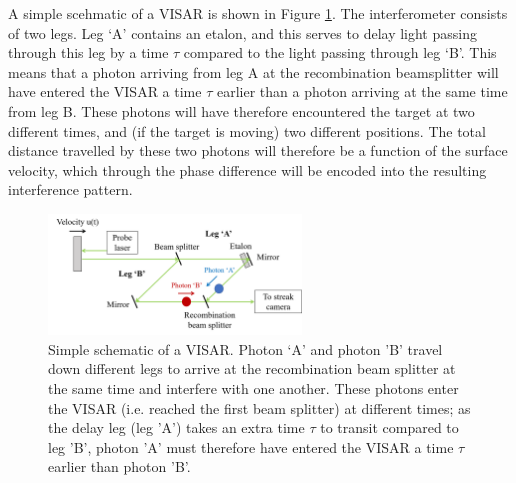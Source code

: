A simple scehmatic of a VISAR is shown in Figure \ref{fig:VISAR_Schematic}. The interferometer consists of two legs. Leg `A' contains an etalon, and this serves to delay light passing through this leg by a time $\tau$ compared to the light passing through leg `B'. This means that a photon arriving from leg A at the recombination beamsplitter will have entered the VISAR a time $\tau$ earlier than a photon arriving at the same time from leg B. These photons will have therefore encountered the target at two different times, and (if the target is moving) two different positions. The total distance travelled by these two photons will therefore be a function of the surface velocity, which through the phase difference will be encoded into the resulting interference pattern.

\begin{figure}
\centering
\includegraphics[width=0.6\textwidth]{figures/Experiment/VISARSchematic.png}%
\caption{\label{fig:VISAR_Schematic} Simple schematic of a VISAR. Photon `A' and photon 'B' travel down different legs to arrive at the recombination beam splitter at the same time and interfere with one another. These photons enter the VISAR (i.e. reached the first beam splitter) at different times; as the delay leg (leg 'A') takes an extra time $\tau$ to transit compared to leg 'B', photon 'A' must therefore have entered the VISAR a time $\tau$ earlier than photon 'B'.}
\end{figure}

